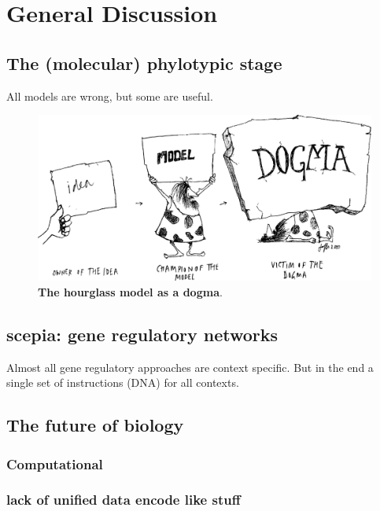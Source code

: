 \chapter{General Discussion}\thumbforchapter
\newpage

\section{The (molecular) phylotypic stage}

All models are wrong, but some are useful. 

\begin{figure}[H]
    \includegraphics[width=\linewidth]{ch.discussion/imgs/dogma.png}
    \caption{\textbf{The hourglass model as a dogma}. \cite{Caveman2000}}
    \label{fig:dogma}
\end{figure}

\section{scepia: gene regulatory networks}

Almost all gene regulatory approaches are context specific. But in the end a single set of instructions (DNA) for all contexts.

\section{The future of biology}

\subsection{Computational}

\subsection{lack of unified data encode like stuff}

